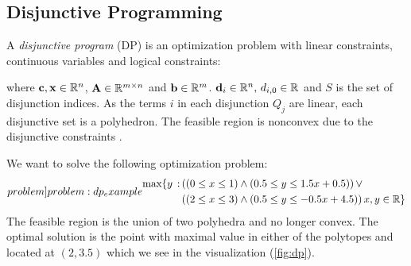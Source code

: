 \subsection{Disjunctive Programming}
A \textit{disjunctive program} (DP) is an optimization problem with linear constraints, continuous variables and logical constraints:


where $\bold c, \bold x \in \mathbb{R}^n$, $ \bold A \in \mathbb{R}^{m \times n}$ and $\bold b \in \mathbb{R}^m$. $\bold d_i \in \mathbb{R}^n, \, d_{i,0} \in \mathbb{R}$ and $S$ is the set of disjunction indices.
As the terms $i$ in each disjunction $Q_j$ are linear, each disjunctive set is a polyhedron. The feasible region is nonconvex due to the disjunctive constraints \cite{balas_disjunctive_2018}.

We want to solve the following optimization problem:
\begin{align} \label[problem]{problem:dp_example}
    \begin{split}
    \text{max} \{y \, : \, &((0 \leq x \leq 1) \land (0.5 \leq y \leq 1.5 x + 0.5)) \, \lor \\ &((2 \leq x \leq 3) \land (0.5 \leq y \leq -0.5 x + 4.5))  \, x,y \in \mathbb{R} \}
    \end{split}
\end{align} 
The feasible region is the union of two polyhedra and no longer convex. The optimal solution is the point with maximal value in either of the polytopes and located at $(2, 3.5)$ which we see in the visualization (\cref{fig:dp}). 

